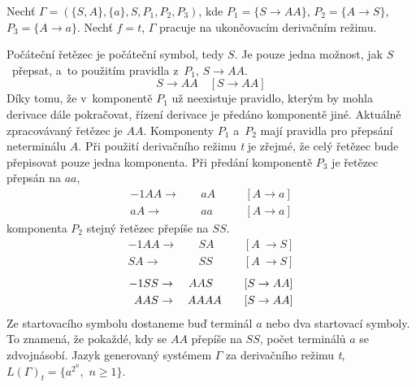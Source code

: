 \begin{example}
    Nechť $\Gamma = (\{S, A\}, \{a\}, S, P_1, P_2, P_3)$, kde $P_1 = \{S \rightarrow AA\}$, $P_2 = \{A \rightarrow S\}$, $P_3 = \{A \rightarrow a\}$.
    Nechť $f = t$, $\Gamma$ pracuje na ukončovacím derivačním režimu.

    Počáteční řetězec je počáteční symbol, tedy $S$. 
    Je pouze jedna možnost, jak $S$~přepsat, a~to použitím pravidla z~$P_1$, $S \rightarrow AA$.
    \begin{equation*}
        S \rightarrow AA \quad [S \rightarrow AA]
    \end{equation*}
    Díky tomu, že v~komponentě $P_1$ už neexistuje pravidlo, kterým by mohla derivace dále pokračovat, řízení derivace je předáno komponentě jiné.
    Aktuálně zpracovávaný řetězec je $AA$.
    Komponenty $P_1$ a~$P_2$ mají pravidla pro přepsání neterminálu $A$.
    Při použití derivačního režimu \emph{t} je zřejmé, že celý řetězec bude přepisovat pouze jedna komponenta.
    Při předání komponentě $P_3$ je řetězec přepsán na $aa$,
    \begin{alignat*}{-1}
        AA \rightarrow&&\; aA \quad &&[A \rightarrow a] \\
        aA \rightarrow&&\; aa \,\quad &&[A \rightarrow a]
    \end{alignat*}
    komponenta $P_2$ stejný řetězec přepíše na $SS$.
    \begin{alignat*}{-1}
        AA  \rightarrow&&\; SA && \quad [A~\rightarrow S] \\
        SA  \rightarrow&&\; SS && \quad [A~\rightarrow S] 
    \end{alignat*}
    \begin{alignat*}{-1}
         SS \rightarrow&&\; AAS  \hphantom{A} \quad  &&[S \rightarrow AA] \\ 
        AAS \rightarrow&&\; AAAA \quad &&[S \rightarrow AA]
    \end{alignat*}
    Ze startovacího symbolu dostaneme buď terminál $a$ nebo dva startovací symboly.
    To znamená, že pokaždé, kdy se $AA$ přepíše na $SS$, počet terminálů $a$ se zdvojnásobí.
    Jazyk generovaný systémem $\Gamma$ za derivačního režimu \emph{t}, $L(\Gamma)_t = \{a^{2^n},$ $n \geq 1 \}$.
\end{example}

